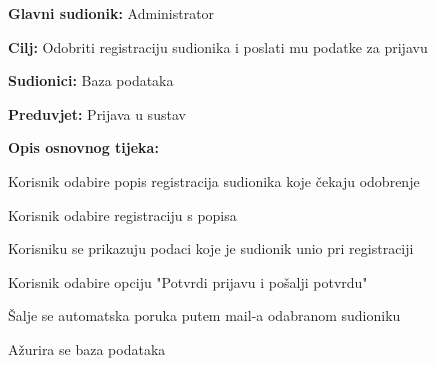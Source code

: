 					\noindent {}
					\begin{packed_item}
	
						\item \textbf{Glavni sudionik: } Administrator
						\item  \textbf{Cilj:} Odobriti registraciju sudionika i poslati mu podatke za prijavu
						\item  \textbf{Sudionici:} Baza podataka
						\item  \textbf{Preduvjet:} Prijava u sustav
						\item  \textbf{Opis osnovnog tijeka:}
						
						\item[] \begin{packed_enum}
	
							\item Korisnik odabire popis registracija sudionika koje čekaju odobrenje
							\item Korisnik odabire registraciju s popisa
							\item Korisniku se prikazuju podaci koje je sudionik unio pri registraciji
							\item Korisnik odabire opciju "Potvrdi prijavu i pošalji potvrdu"
							\item Šalje se automatska poruka putem mail-a odabranom sudioniku
							\item Ažurira se baza podataka

					
						\end{packed_enum}
			
					\end{packed_item}

